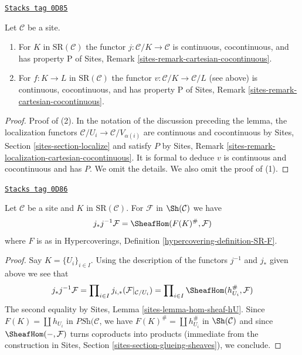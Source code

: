 \begin{lemma}[Has P]
\label{spaces-simplicial-lemma-has-P}
\href{https://stacks.math.columbia.edu/tag/0D85}{\texttt{Stacks tag 0D85}}

Let $\mathcal{C}$ be a site.
\begin{enumerate}
\item For $K$ in $\text{SR}(\mathcal{C})$ the functor
$j : \mathcal{C}/K \to \mathcal{C}$ is continuous,
cocontinuous, and has property P of
Sites, Remark \ref{sites-remark-cartesian-cocontinuous}.
\item For $f : K \to L$ in $\text{SR}(\mathcal{C})$
the functor $v : \mathcal{C}/K \to \mathcal{C}/L$ (see above)
is continuous, cocontinuous, and has property P of
Sites, Remark \ref{sites-remark-cartesian-cocontinuous}.
\end{enumerate}
\end{lemma}

\begin{proof}
Proof of (2). In the notation of the discussion preceding the lemma,
the localization functors $\mathcal{C}/U_i \to \mathcal{C}/V_{\alpha(i)}$
are continuous and cocontinuous by
Sites, Section \ref{sites-section-localize}
and satisfy $P$ by
Sites, Remark \ref{sites-remark-localization-cartesian-cocontinuous}.
It is formal to deduce $v$ is continuous and cocontinuous and has $P$.
We omit the details. We also omit the proof of (1).
\end{proof}

\begin{lemma}
\label{spaces-simplicial-lemma-push-pull-localization}
\href{https://stacks.math.columbia.edu/tag/0D86}{\texttt{Stacks tag 0D86}}

Let $\mathcal{C}$ be a site and $K$ in $\text{SR}(\mathcal{C})$.
For $\mathcal{F}$ in $\Sh(\mathcal{C})$ we have
$$
j_*j^{-1}\mathcal{F} = \SheafHom(F(K)^\#, \mathcal{F})
$$
where $F$ is as in
Hypercoverings, Definition \ref{hypercovering-definition-SR-F}.
\end{lemma}

\begin{proof}
Say $K = \{U_i\}_{i \in I}$.
Using the description of the functors $j^{-1}$ and $j_*$
given above we see that
$$
j_*j^{-1}\mathcal{F} =
\prod\nolimits_{i \in I} j_{i, *}(\mathcal{F}|_{\mathcal{C}/U_i}) =
\prod\nolimits_{i \in I} \SheafHom(h_{U_i}^\#, \mathcal{F})
$$
The second equality by Sites, Lemma \ref{sites-lemma-hom-sheaf-hU}.
Since $F(K) = \coprod h_{U_i}$ in $\textit{PSh}(\mathcal{C}$,
we have $F(K)^\# = \coprod h_{U_i}^\#$ in $\Sh(\mathcal{C})$
and since $\SheafHom(-, \mathcal{F})$ turns coproducts into
products (immediate from the construction in
Sites, Section \ref{sites-section-glueing-sheaves}), we conclude.
\end{proof}


